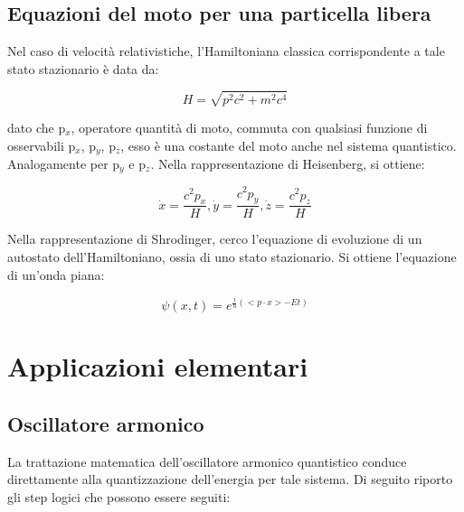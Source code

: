 \documentclass{article}
\begin{document}
\subsection{Equazioni del moto per una particella libera}
Nel caso di velocità relativistiche, l'Hamiltoniana classica corrispondente a tale stato stazionario è data da:

\begin{equation}
    H= \sqrt{p^2c^2+m^2c^4}
\end{equation}

dato che p$_x$, operatore quantità di moto, commuta con qualsiasi funzione di osservabili p$_x$, p$_y$, p$_z$, esso è  una costante del moto
anche nel sistema quantistico. Analogamente per p$_y$ e p$_z$.
Nella rappresentazione di Heisenberg, si ottiene:

\begin{equation}
    \dot{x}=\frac{c^2 p_x}{H}, \dot{y}=\frac{c^2 p_y}{H}, \dot{z}=\frac{c^2 p_z}{H}
\end{equation}

Nella rappresentazione di Shrodinger, cerco l'equazione di evoluzione di un autostato dell'Hamiltoniano, ossia di uno stato stazionario.
Si ottiene l'equazione di un'onda piana:

\begin{equation}
    \psi(x,t)=e^{\frac{i}{\hbar}(<p\cdot x>-Et)}
\end{equation}

\section{Applicazioni elementari}
\subsection{Oscillatore armonico}
La trattazione matematica dell'oscillatore armonico quantistico conduce direttamente alla quantizzazione dell'energia per tale sistema.
Di seguito riporto gli step logici che possono essere seguiti:
\end{document}
